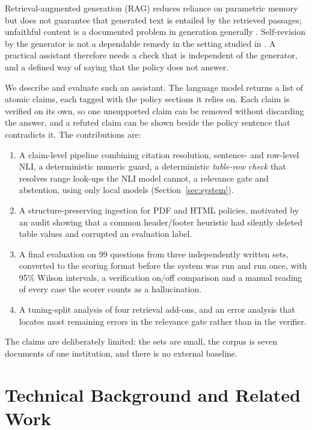 \documentclass[conference]{IEEEtran}
\begin{document}
Retrieval-augmented generation (RAG) \cite{lewis2020rag} reduces reliance on parametric memory but does
not guarantee that generated text is entailed by the retrieved passages; unfaithful content is a
documented problem in generation generally \cite{maynez2020faithfulness}. Self-revision by the generator is
not a dependable remedy in the setting studied in \cite{huang2024selfcorrect}. A practical assistant
therefore needs a check that is independent of the generator, and a defined way of saying that the policy
does not answer.

We describe and evaluate such an assistant. The language model returns a list of atomic claims, each
tagged with the policy sections it relies on. Each claim is verified on its own, so one unsupported claim
can be removed without discarding the answer, and a refuted claim can be shown beside the policy sentence
that contradicts it. The contributions are:
\begin{enumerate}
\item A claim-level pipeline combining citation resolution, sentence- and row-level NLI, a deterministic
numeric guard, a deterministic \emph{table-row check} that resolves range look-ups the NLI model cannot,
a relevance gate and abstention, using only local models (Section~\ref{sec:system}).
\item A structure-preserving ingestion for PDF and HTML policies, motivated by an audit showing that a
common header/footer heuristic had silently deleted table values and corrupted an evaluation label.
\item A final evaluation on 99 questions from three independently written sets, converted to the scoring
format before the system was run and run once, with 95\% Wilson intervals, a verification on/off
comparison and a manual reading of every case the scorer counts as a hallucination.
\item A tuning-split analysis of four retrieval add-ons, and an error analysis that locates most remaining
errors in the relevance gate rather than in the verifier.
\end{enumerate}
The claims are deliberately limited: the sets are small, the corpus is seven documents of one
institution, and there is no external baseline.

\section{Technical Background and Related Work}
\end{document}
